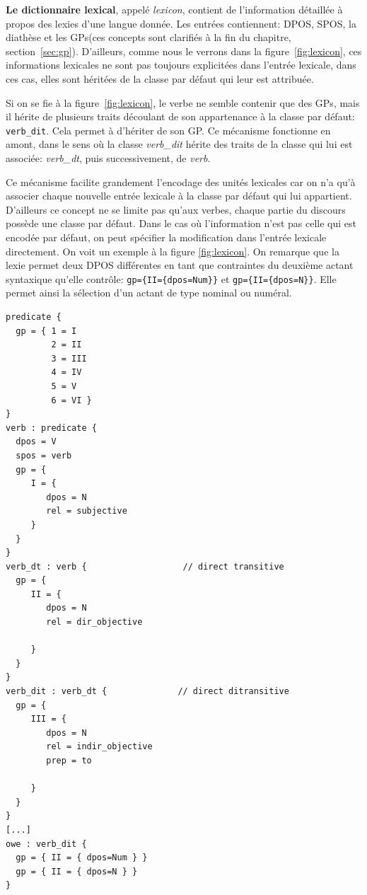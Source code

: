 \textbf{Le dictionnaire lexical}, appelé \emph{lexicon}, contient de l'information détaillée à propos des lexies d'une langue donnée. Les entrées contiennent: \ac{DPOS}, \ac{SPOS}, la diathèse et les \acp{GP}(ces concepts sont clarifiés à la fin du chapitre, section~\ref{sec:gp}).  D'ailleurs, comme nous le verrons dans la figure~\ref{fig:lexicon}, ces informations lexicales ne sont pas toujours explicitées dans l'entrée lexicale, dans ces cas, elles sont héritées de la classe par défaut qui leur est attribuée.

Si on se fie à la figure~\ref{fig:lexicon}, le verbe  ne semble contenir que des \acp{GP}, mais il hérite de plusieurs traits découlant de son appartenance à la classe par défaut: \texttt{verb\_dit}. Cela permet à  d'hériter de son \ac{GP}. Ce mécanisme fonctionne en amont, dans le sens où la classe \emph{verb\_dit} hérite des traits de la classe qui lui est associée: \emph{verb\_dt}, puis successivement, de \emph{verb}.

Ce mécanisme facilite grandement l'encodage des unités lexicales car on n'a qu'à associer chaque nouvelle entrée lexicale à la classe par défaut qui lui appartient. D'ailleurs ce concept ne se limite pas qu'aux verbes, chaque partie du discours possède une classe par défaut. Dans le cas où l'information n'est pas celle qui est encodée par défaut, on peut spécifier la modification dans l'entrée lexicale directement. On voit un exemple à la figure \ref{fig:lexicon}. On remarque que la lexie  permet deux \ac{DPOS} différentes en tant que contraintes du deuxième actant syntaxique qu'elle contrôle: \lstinline!gp={II={dpos=Num}}! et \lstinline!gp={II={dpos=N}}!. Elle permet ainsi la sélection d'un actant de type nominal ou numéral.

\begin{minipage}{\linewidth}
\begin{lstlisting}[language=Xml, caption = Échantillon du \emph{lexicon}, label=fig:lexicon]
predicate {
  gp = { 1 = I
         2 = II
         3 = III
         4 = IV
         5 = V
         6 = VI }
}
verb : predicate {
  dpos = V
  spos = verb
  gp = {
     I = {
        dpos = N
        rel = subjective
     }
  }
}
verb_dt : verb {                   // direct transitive
  gp = {
     II = {
        dpos = N
        rel = dir_objective

     }
  }
}
verb_dit : verb_dt {              // direct ditransitive
  gp = {
     III = {
        dpos = N
        rel = indir_objective
        prep = to  

     }
  }
}
[...]
owe : verb_dit {
  gp = { II = { dpos=Num } }
  gp = { II = { dpos=N } }
}
\end{lstlisting}
\end{minipage}

